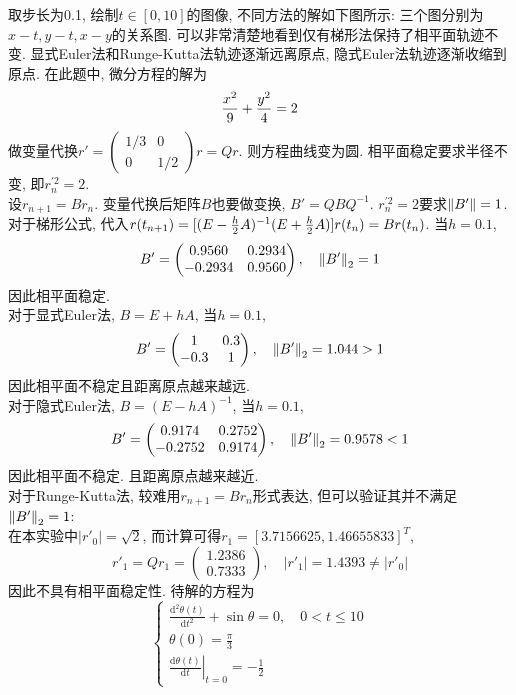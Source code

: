 \documentclass[UTF8,9pt]{ctexart}
\begin{document}
取步长为0.1, 绘制$t\in[0,10]$的图像, 不同方法的解如下图所示:
三个图分别为$x-t,y-t,x-y$的关系图. 可以非常清楚地看到仅有梯形法保持了相平面轨迹不变. 显式Euler法和Runge-Kutta法轨迹逐渐远离原点, 隐式Euler法轨迹逐渐收缩到原点.
在此题中, 微分方程的解为
$$\frac{x^2}{9}+\frac{y^2}{4}=2$$
做变量代换$r' = \begin{pmatrix}1/3&0\\0&1/2 \end{pmatrix}r = Qr$. 则方程曲线变为圆. 相平面稳定要求半径不变, 即$r^{'2}_n = 2$. \\
设$r_{n+1} = Br_n$. 变量代换后矩阵$B$也要做变换, $B' = QBQ^{-1}$. $r^{'2}_n = 2$要求$\left\| B' \right\|=1$. \\
对于梯形公式, 代入$r(t_{n+1}) = [(E-\frac{h}{2}A)^{-1}(E+\frac{h}{2}A)]r(t_n) = Br(t_n)$. 当$h=0.1$, 
$$B' = \begin{pmatrix}
0.9560   & 0.2934\\
-0.2934  &  0.9560\\
\end{pmatrix},
\quad
\left\| B' \right\|_2 = 1$$
因此相平面稳定. \\
对于显式Euler法, $B= E+hA$, 当$h=0.1$, 
$$B' = \begin{pmatrix}
        1   & 0.3\\
        -0.3  &  1\\
        \end{pmatrix},
        \quad
        \left\| B' \right\|_2 = 1.044>1$$
因此相平面不稳定且距离原点越来越远. \\
对于隐式Euler法, $B= (E-hA)^{-1}$, 当$h=0.1$, 
$$B' = \begin{pmatrix}
        0.9174   & 0.2752\\
        -0.2752  &  0.9174\\
        \end{pmatrix},
        \quad
        \left\| B' \right\|_2 = 0.9578<1$$
因此相平面不稳定. 且距离原点越来越近. \\
对于Runge-Kutta法, 较难用$r_{n+1} = Br_n$形式表达, 但可以验证其并不满足$\left\| B' \right\|_2=1$:\\
在本实验中$|r'_0| = \sqrt{2}$, 而计算可得$r_1 = [3.7156625, 1.46655833]^T$, 
$$r'_1 = Qr_1 = \begin{pmatrix}
1.2386\\
0.7333\end{pmatrix},\quad |r'_1| = 1.4393\neq|r'_0|
$$
因此不具有相平面稳定性. 
待解的方程为$$ 
\left\{\begin{array}{l}{\frac{\mathrm{d}^{2} \theta(t)}{\mathrm{d} t^{2}}+\sin \theta=0, \quad 0<t \leq 10} \\ {\theta(0)=\frac{\pi}{3}} \\ {\left.\frac{\mathrm{d} \theta(t)}{\mathrm{d} t}\right|_{t=0}=-\frac{1}{2}}\end{array}\right.
 $$
\end{document}
